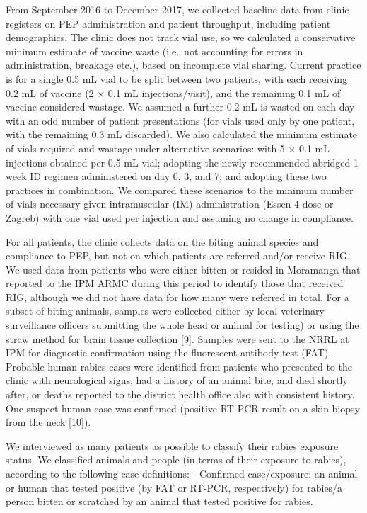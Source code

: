 \documentclass[
]{book}
\begin{document}
From September 2016 to December 2017, we collected baseline data from clinic registers on PEP administration and patient throughput, including patient demographics. The clinic does not track vial use, so we calculated a conservative minimum estimate of vaccine waste (i.e.~not accounting for errors in administration, breakage etc.), based on incomplete vial sharing. Current practice is for a single 0.5 mL vial to be split between two patients, with each receiving 0.2 mL of vaccine (2 × 0.1 mL injections/visit), and the remaining 0.1 mL of vaccine considered wastage. We assumed a further 0.2 mL is wasted on each day with an odd number of patient presentations (for vials used only by one patient, with the remaining 0.3 mL discarded). We also calculated the minimum estimate of vials required and wastage under alternative scenarios: with 5 × 0.1 mL injections obtained per 0.5 mL vial; adopting the newly recommended abridged 1-week ID regimen administered on day 0, 3, and 7; and adopting these two practices in combination. We compared these scenarios to the minimum number of vials necessary given intramuscular (IM) administration (Essen 4-dose or Zagreb) with one vial used per injection and assuming no change in compliance.

For all patients, the clinic collects data on the biting animal species and compliance to PEP, but not on which patients are referred and/or receive RIG. We used data from patients who were either bitten or resided in Moramanga that reported to the IPM ARMC during this period to identify those that received RIG, although we did not have data for how many were referred in total. For a subset of biting animals, samples were collected either by local veterinary surveillance officers submitting the whole head or animal for testing) or using the straw method for brain tissue collection {[}9{]}. Samples were sent to the NRRL at IPM for diagnostic confirmation using the fluorescent antibody test (FAT). Probable human rabies cases were identified from patients who presented to the clinic with neurological signs, had a history of an animal bite, and died shortly after, or deaths reported to the district health office also with consistent history. One suspect human case was confirmed (positive RT-PCR result on a skin biopsy from the neck {[}10{]}).

We interviewed as many patients as possible to classify their rabies exposure status. We classified animals and people (in terms of their exposure to rabies), according to the following case definitions: - Confirmed case/exposure: an animal or human that tested positive (by FAT or RT-PCR, respectively) for rabies/a person bitten or scratched by an animal that tested positive for rabies.
\end{document}

